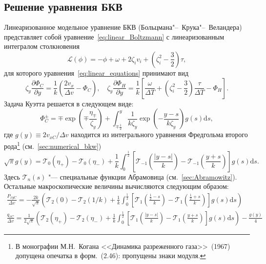 \documentclass[a4paper,12pt]{article}
\newcommand{\dd}{\mathrm{d}}
\newcommand{\pder}[2][]{\frac{\partial#1}{\partial#2}}
\begin{document}
\subsection{Решение уравнения БКВ}

Линеаризованное модельное уравнение БКВ (Больцмана"--~Крука"--~Веландера)
представляет собой уравнение~\eqref{eq:linear_Boltzmann} с линеаризованным интегралом столкновения
\begin{equation}\label{eq:linear_bkw}
    \mathcal{L}(\phi) = -\phi + \omega + 2\zeta_i v_i + \left(\zeta_i^2-\frac32\right)\tau,
\end{equation}
для которого уравнения~\eqref{eq:linear_equations} принимают вид
\begin{equation}\label{eq:linear_bkw_equations}
    \zeta_y \pder[\Phi_C]{y} = \frac1{k}\left( \frac{2v_x}{\Delta{v}} - \Phi_C \right), \quad
    \zeta_y \pder[\Phi_H]{y} = \frac1{k}\left[ \frac{\omega}{\Delta{T}}
        + \left(\zeta_i^2-\frac32\right)\frac{\tau}{\Delta{T}} - \Phi_H \right].
\end{equation}
Задача Куэтта решается в следующем виде:
\begin{equation}\label{eq:bkw_couette}
    \Phi_C^\pm = \mp \exp\left(\mp\frac{\eta_\mp}{\zeta_y}\right) +
        \int_{\mp\frac12}^y \frac1{k\zeta_y} \exp \left(-\frac{y-s}{k\zeta_y}\right) g(s) \dd{s},
\end{equation}
где \(g(y) \equiv 2v_{xC}/\Delta v\) находится из интегрального уравнения Фредгольма второго рода\footnote{
    В монографии М.Н.~Когана <<Динамика разреженного газа>>~(1967)~\cite{Kogan1967}
    допущена опечатка в форм.~(2.46): пропущены знаки модуля.
} (см.~\cref{sec:numerical_bkw})
\begin{equation}\label{eq:bkw_g_equation}
    \sqrt\pi g(y) = \mathcal{T}_0(\eta_+) - \mathcal{T}_0(\eta_-)
        + \frac1k \int_0^{\frac12} \left[ \mathcal{T}_{-1}\left(\frac{|y-s|}{k}\right)
        - \mathcal{T}_{-1}\left(\frac{y+s}{k}\right) \right] g(s) \dd{s}.
\end{equation}
Здесь \(\mathcal{T}_n(s)\) "--- специальные функции Абрамовица (см.~\cref{sec:Abramowitz}).
Остальные макроскопические величины вычисляются следующим образом:
\begin{gather}\label{eq:bkw_couette_macro}
    \frac{P_{xyC}}{\Delta v} = -\frac{2k}{\sqrt\pi} \left(
        \mathcal{T}_2(0)-\mathcal{T}_2(1/k)
        + \frac1k\int_0^{\frac12}\left[
            \mathcal{T}_1\left(\frac{\frac12-s}k\right)-\mathcal{T}_1\left(\frac{\frac12+s}k\right)
        \right]g(s)\dd{s}
        \right) \\
    \frac{q_{xC}}{\Delta v} = \frac1{2\sqrt\pi}\left(
        \mathcal{T}_2(\eta_+)-\mathcal{T}_2(\eta_-)
        + \frac1k\int_0^{\frac12}\left[
            \mathcal{T}_1\left(\frac{|y-s|}k\right)-\mathcal{T}_1\left(\frac{y+s}k\right)
        \right]g(s)\dd{s}
        \right) - \frac{g(y)}4
\end{gather}
\end{document}
